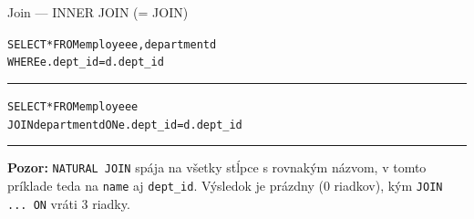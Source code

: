 \documentclass[12pt]{beamer}
\begin{document}
\begin{frame}[fragile]{Join --- INNER JOIN (= JOIN)}
\footnotesize
\begin{alltt}
SELECT * FROM employee e, department d
WHERE e.dept\_id = d.dept\_id
\end{alltt}
\vspace{-0.4em}\rule{\linewidth}{0.3pt}\vspace{-0.2em}
\begin{alltt}
SELECT * FROM employee e
    JOIN department d ON e.dept\_id = d.dept\_id
\end{alltt}
\vspace{-0.4em}\rule{\linewidth}{0.3pt}\vspace{-0.2em}
\textbf{Pozor:} \texttt{NATURAL JOIN} spája na všetky stĺpce s rovnakým názvom, v tomto príklade teda na \texttt{name} aj \texttt{dept\_id}. Výsledok je prázdny (0 riadkov), kým \texttt{JOIN ... ON} vráti 3 riadky.
\end{frame}
\end{document}
